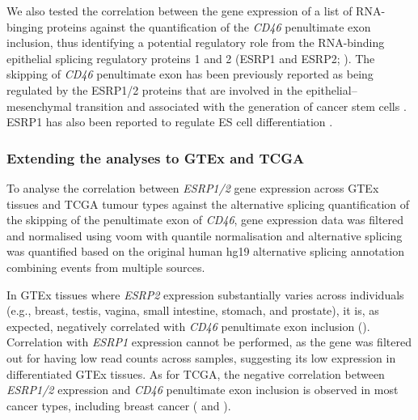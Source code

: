 We also tested the correlation between the gene expression of a list of RNA-binging proteins \cite{sebestyen:2016tr} against the quantification of the \emph{CD46} penultimate exon inclusion, thus identifying a potential regulatory role from the RNA-binding epithelial splicing regulatory proteins 1 and 2 (ESRP1 and ESRP2; ). The skipping of \emph{CD46} penultimate exon has been previously reported as being regulated by the ESRP1/2 proteins that are involved in the epithelial–mesenchymal transition and associated with the generation of cancer stem cells \cite{pradella:2017wp,warzecha:2010wi}. ESRP1 has also been reported to regulate ES cell differentiation \cite{fagoonee:2013vx}.

\subsubsection{Extending the analyses to GTEx and TCGA}

To analyse the correlation between \emph{ESRP1/2} gene expression across GTEx tissues and TCGA tumour types against the alternative splicing quantification of the skipping of the penultimate exon of \emph{CD46}, gene expression data was filtered and normalised using voom with quantile normalisation \cite{ritchie:2015tm} and alternative splicing was quantified based on the original human hg19 alternative splicing annotation combining events from multiple sources.

In GTEx tissues where \emph{ESRP2} expression substantially varies across individuals (e.g., breast, testis, vagina, small intestine, stomach, and prostate), it is, as expected, negatively correlated with \emph{CD46} penultimate exon inclusion (). Correlation with \emph{ESRP1} expression cannot be performed, as the gene was filtered out for having low read counts across samples, suggesting its low expression in differentiated GTEx tissues. As for TCGA, the negative correlation between \emph{ESRP1/2} expression and \emph{CD46} penultimate exon inclusion is observed in most cancer types, including breast cancer ( and ).

